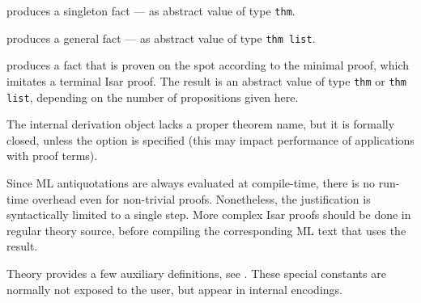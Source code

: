 \begin{isabellebody}
\begin{isamarkuptext}
\begin{description}
  \item {} produces a singleton fact --- as abstract
  value of type \verb|thm|.

  \item {} produces a general fact --- as abstract
  value of type \verb|thm list|.

  \item {} produces a fact that is proven on
  the spot according to the minimal proof, which imitates a terminal
  Isar proof.  The result is an abstract value of type \verb|thm|
  or \verb|thm list|, depending on the number of propositions
  given here.

  The internal derivation object lacks a proper theorem name, but it
  is formally closed, unless the  option is specified
  (this may impact performance of applications with proof terms).

  Since ML antiquotations are always evaluated at compile-time, there
  is no run-time overhead even for non-trivial proofs.  Nonetheless,
  the justification is syntactically limited to a single \hyperlink{command.by}{\mbox{}} step.  More complex Isar proofs should be done in regular
  theory source, before compiling the corresponding ML text that uses
  the result.

  \end{description}%
\end{isamarkuptext}%
\isamarkuptrue%
%
\endisatagmlantiq
{\isafoldmlantiq}%
%
\isadelimmlantiq
%
\endisadelimmlantiq
%
\isamarkuptrue%
%
\begin{isamarkuptext}%
Theory  provides a few auxiliary definitions, see
  .  These special constants are normally not
  exposed to the user, but appear in internal encodings.


\end{isamarkuptext}
\end{isabellebody}
